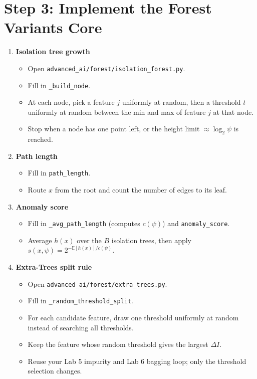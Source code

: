 \section*{Step 3: Implement the Forest Variants Core}
\begin{enumerate}[label=\textbf{T\arabic*.}]
  \item \textbf{Isolation tree growth}
\begin{itemize}
  \item Open \texttt{advanced\_ai/forest/isolation\_forest.py}.
  \item Fill in \texttt{\_build\_node}.
  \item At each node, pick a feature $j$ uniformly at random, then a threshold $t$ uniformly at random between the min and max of feature $j$ at that node.
  \item Stop when a node has one point left, or the height limit $\approx \log_2 \psi$ is reached.
\end{itemize}

  \item \textbf{Path length}
\begin{itemize}
  \item Fill in \texttt{path\_length}.
  \item Route $x$ from the root and count the number of edges to its leaf.
\end{itemize}

  \item \textbf{Anomaly score}
\begin{itemize}
  \item Fill in \texttt{\_avg\_path\_length} (computes $c(\psi)$) and \texttt{anomaly\_score}.
  \item Average $h(x)$ over the $B$ isolation trees, then apply $s(x,\psi) = 2^{-\mathbb{E}[h(x)]/c(\psi)}$.
\end{itemize}

  \item \textbf{Extra-Trees split rule}
\begin{itemize}
  \item Open \texttt{advanced\_ai/forest/extra\_trees.py}.
  \item Fill in \texttt{\_random\_threshold\_split}.
  \item For each candidate feature, draw one threshold uniformly at random instead of searching all thresholds.
  \item Keep the feature whose random threshold gives the largest $\Delta I$.
  \item Reuse your Lab 5 impurity and Lab 6 bagging loop; only the threshold selection changes.
\end{itemize}


\end{enumerate}
